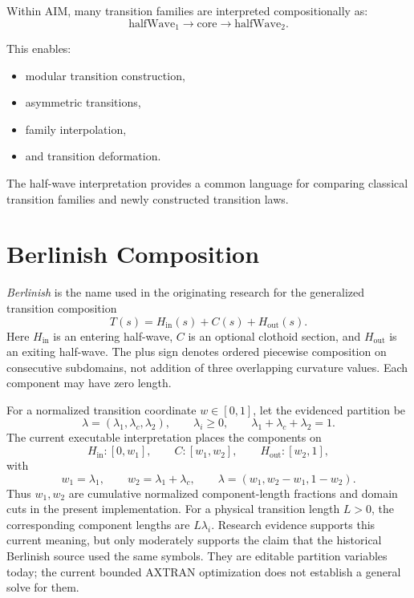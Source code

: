 Within AIM, many transition families are interpreted compositionally as:
\[
\text{halfWave}_1
\rightarrow
\text{core}
\rightarrow
\text{halfWave}_2.
\]

This enables:
\begin{itemize}
\item modular transition construction,
\item asymmetric transitions,
\item family interpolation,
\item and transition deformation.
\end{itemize}

The half-wave interpretation provides a common language for comparing
classical transition families and newly constructed transition laws.

\section{Berlinish Composition}
\label{sec:berlinish-composition}

\emph{Berlinish} is the name used in the originating research for the
generalized transition composition
\[
T(s)
=
H_{\mathrm{in}}(s)
+
C(s)
+
H_{\mathrm{out}}(s).
\]
Here \(H_{\mathrm{in}}\) is an entering half-wave, \(C\) is an optional
clothoid section, and \(H_{\mathrm{out}}\) is an exiting half-wave. The plus
sign denotes ordered piecewise composition on consecutive subdomains, not
addition of three overlapping curvature values. Each component may have zero
length.

For a normalized transition coordinate $w\in[0,1]$, let the evidenced
partition be
\[
\lambda=(\lambda_1,\lambda_c,\lambda_2),\qquad
\lambda_i\geq0,\qquad \lambda_1+\lambda_c+\lambda_2=1.
\]
The current executable interpretation places the components on
\[
H_{\mathrm{in}}:[0,w_1],\qquad
C:[w_1,w_2],\qquad
H_{\mathrm{out}}:[w_2,1],
\]
with
\begin{equation}
w_1=\lambda_1,\qquad
w_2=\lambda_1+\lambda_c,\qquad
\lambda=(w_1,w_2-w_1,1-w_2).
\label{eq:berlinish-partition-cuts}
\end{equation}
Thus $w_1,w_2$ are cumulative normalized component-length fractions and
domain cuts in the present implementation. For a physical transition length
$L>0$, the corresponding component lengths are $L\lambda_i$. Research
evidence supports this current meaning, but only moderately supports the
claim that the historical Berlinish source used the same symbols. They are
editable partition variables today; the current bounded AXTRAN optimization
does not establish a general solve for them.

